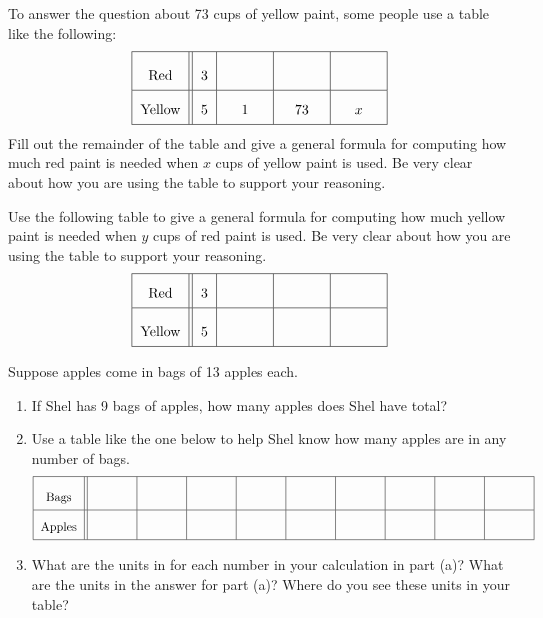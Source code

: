 \vspace{0.25in}


\begin{prob}
To answer the question about 73 cups of yellow paint, some people use a table like the following:  
\[{\renewcommand{\arraystretch}{2}
\begin{tabular}{|c||c|c|c|c|}\hline
Red  &  3 &\rule[7mm]{10mm}{0mm} &\rule[7mm]{10mm}{0mm} & \rule[7mm]{10mm}{0mm}     \\ \hline
Yellow & 5 & 1 & 73 & $x$ \\ \hline
\end{tabular}}
\]
Fill out the remainder of the table and give a general formula for 
computing how much red paint is needed when $x$ cups of yellow 
paint is used.  Be very clear about how you 
are using the table to support your reasoning.  
\end{prob}

\begin{prob}
Use the following table to give a general formula for 
computing how much yellow paint is needed when $y$ cups of red 
paint is used.  Be very clear about how you 
are using the table to support your reasoning. 
\[{\renewcommand{\arraystretch}{2}
\begin{tabular}{|c||c|c|c|c|}\hline
Red  &  3 &  &  &     \\ \hline
Yellow & 5  &\rule[7mm]{10mm}{0mm} &\rule[7mm]{10mm}{0mm} & \rule[7mm]{10mm}{0mm} \\ \hline
\end{tabular}}
\]
\end{prob}

\begin{prob}
Suppose apples come in bags of 13 apples each.  
\begin{enumerate}
\item If Shel has 9 bags of apples, how many apples does Shel have total?  
\item Use a table like the one below to help Shel know how many apples are in any number of bags.  
\[{\renewcommand{\arraystretch}{2}
\begin{tabular}{|c||c|c|c|c|c|c|c|c|c|}\hline
Bags  &  \rule[7mm]{10mm}{0mm} &\rule[7mm]{10mm}{0mm} & \rule[7mm]{10mm}{0mm} & \rule[7mm]{10mm}{0mm}  & \rule[7mm]{10mm}{0mm}
 & \rule[7mm]{10mm}{0mm} & \rule[7mm]{10mm}{0mm} & \rule[7mm]{10mm}{0mm} & \rule[7mm]{10mm}{0mm}   \\ \hline
Apples &  &  &  &  & & & & & \\ \hline
\end{tabular}}
\]
\item What are the units in for each number in your calculation in part (a)?  What are the units in the answer for part (a)?  Where do you see these units in your table?  
\end{enumerate}
\end{prob}
